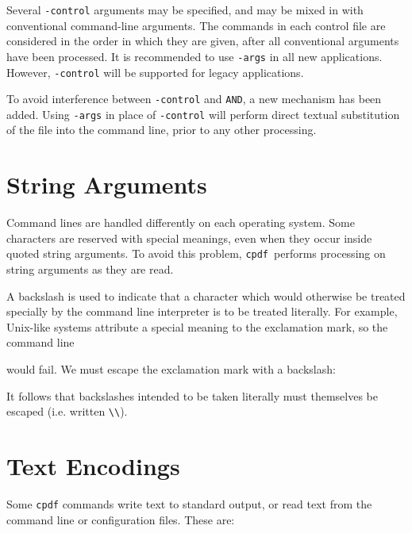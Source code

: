 \documentclass{book}
\newcommand{\cpdf}{\texttt{cpdf}}
\begin{document}
Several \verb!-control! arguments may be specified, and may be mixed in with
conventional command-line arguments. The commands in each control file are
considered in the order in which they are given, after all conventional
arguments have been processed. It is recommended to use \texttt{-args} in all new applications. However, \texttt{-control} will be supported for legacy applications.

To avoid interference between \texttt{-control} and \texttt{AND}, a new mechanism has been added. Using \texttt{-args} in place of \texttt{-control} will perform direct textual substitution of the file into the command line, prior to any other processing.


\section{String Arguments}
Command lines are handled differently on each operating system. Some
characters are reserved with special meanings, even when they occur inside
quoted string arguments. To avoid this problem, \cpdf\ performs processing on
string arguments as they are read.

A backslash is used to indicate that a character which would otherwise be
treated specially by the command line interpreter is to be treated literally. For
example, Unix-like systems attribute a special meaning to the exclamation mark, so
the command line

\noindent{}

\noindent would fail. We must escape the exclamation mark with a backslash:

\noindent{}

\noindent It follows that backslashes intended to be taken literally must themselves be
escaped (i.e. written \verb!\\!).


\section{Text Encodings}

Some \texttt{cpdf} commands write text to standard output, or read text from
the command line or configuration files. These are:

\noindent{}
\end{document}
